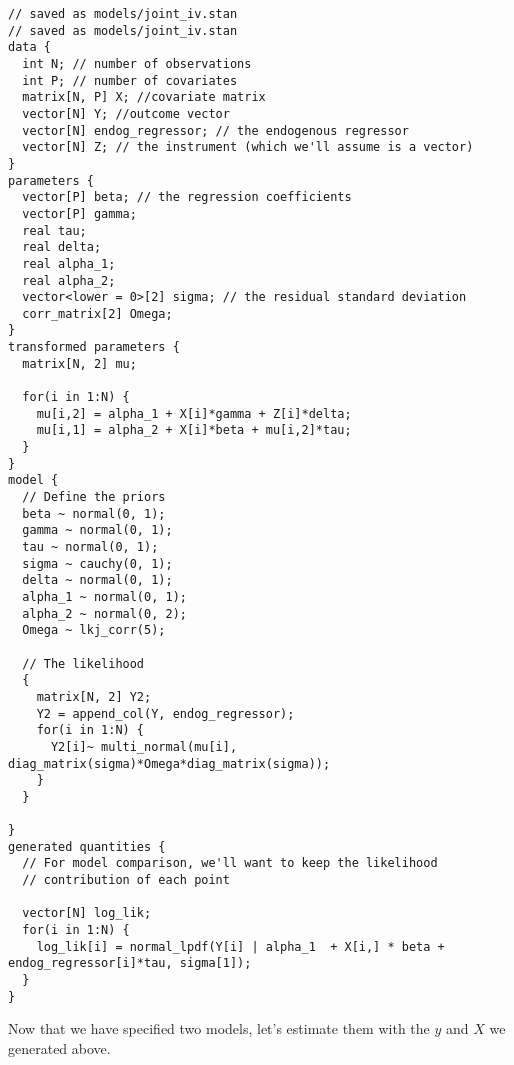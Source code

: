\documentclass[]{book}
\begin{document}
\begin{verbatim}
// saved as models/joint_iv.stan
// saved as models/joint_iv.stan
data {
  int N; // number of observations
  int P; // number of covariates
  matrix[N, P] X; //covariate matrix
  vector[N] Y; //outcome vector
  vector[N] endog_regressor; // the endogenous regressor
  vector[N] Z; // the instrument (which we'll assume is a vector)
}
parameters {
  vector[P] beta; // the regression coefficients
  vector[P] gamma;
  real tau;
  real delta;
  real alpha_1;
  real alpha_2;
  vector<lower = 0>[2] sigma; // the residual standard deviation
  corr_matrix[2] Omega;
}
transformed parameters {
  matrix[N, 2] mu;
  
  for(i in 1:N) {
    mu[i,2] = alpha_1 + X[i]*gamma + Z[i]*delta;
    mu[i,1] = alpha_2 + X[i]*beta + mu[i,2]*tau;
  }
}
model {
  // Define the priors
  beta ~ normal(0, 1); 
  gamma ~ normal(0, 1);
  tau ~ normal(0, 1);
  sigma ~ cauchy(0, 1);
  delta ~ normal(0, 1);
  alpha_1 ~ normal(0, 1);
  alpha_2 ~ normal(0, 2);
  Omega ~ lkj_corr(5);
  
  // The likelihood
  {
    matrix[N, 2] Y2;
    Y2 = append_col(Y, endog_regressor);
    for(i in 1:N) {
      Y2[i]~ multi_normal(mu[i], diag_matrix(sigma)*Omega*diag_matrix(sigma));
    }
  }
  
}
generated quantities {
  // For model comparison, we'll want to keep the likelihood
  // contribution of each point

  vector[N] log_lik;
  for(i in 1:N) {
    log_lik[i] = normal_lpdf(Y[i] | alpha_1  + X[i,] * beta + endog_regressor[i]*tau, sigma[1]);
  }
}
\end{verbatim}

Now that we have specified two models, let's estimate them with the
\(y\) and \(X\) we generated above.
\end{document}
